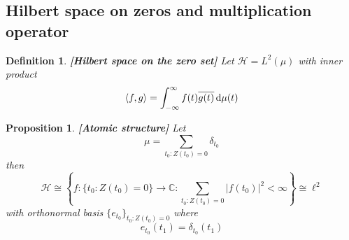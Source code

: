 \documentclass{article}
\newcommand{\mathd}{\mathrm{d}}
\newcommand{\tmstrong}[1]{\textbf{#1}}
\newtheorem{definition}{Definition}
\newtheorem{proposition}{Proposition}
{\theorembodyfont{\rmfamily}\newtheorem{remark}{Remark}}
\begin{document}
\subsection{Hilbert space on zeros and multiplication operator}

\begin{definition}
  {\tmstrong{[Hilbert space on the zero set]\label{labeldef:Hmu}}} Let
  $\mathcal{H}= L^2 (\mu)$ with inner product
  \begin{equation}
    \langle f, g \rangle = \int_{- \infty}^{\infty} f (t) \overline{g (t)}
    \hspace{0.17em} \mathd \mu (t)
  \end{equation}
\end{definition}

\begin{proposition}
  {\tmstrong{[Atomic structure]\label{prop:atomic}}} Let
  \begin{equation}
    \mu = \sum_{t_0 : Z (t_0) = 0} \delta_{t_0}
  \end{equation}
  then
  \begin{equation}
    \mathcal{H} \cong \left\{ f : \{t_0 : Z (t_0) = 0\} \to \mathbb{C}:
    \sum_{t_0 : Z (t_0) = 0} |f (t_0) |^2 < \infty \right\} \cong \ell^2
  \end{equation}
  with orthonormal basis $\{e_{t_0} \}_{t_0 : Z (t_0) = 0}$ where
  \begin{equation}
    e_{t_0} (t_1) = \delta_{t_0 } (t_1)
  \end{equation}
\end{proposition}
\end{document}
